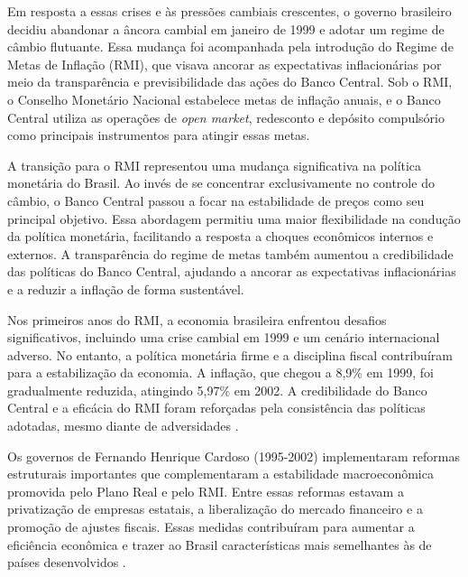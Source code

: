 \documentclass[12pt,oneside,a4paper,chapter=TITLE,english,brazil,sumario=abnt-6027-2012]{abntex2}
\begin{document}
Em resposta a essas crises e às pressões cambiais crescentes, o governo brasileiro decidiu abandonar a âncora cambial em janeiro de 1999 e adotar um regime de câmbio flutuante. Essa mudança foi acompanhada pela introdução do Regime de Metas de Inflação (RMI), que visava ancorar as expectativas inflacionárias por meio da transparência e previsibilidade das ações do Banco Central. Sob o RMI, o Conselho Monetário Nacional estabelece metas de inflação anuais, e o Banco Central utiliza as operações de \textit{open market}, redesconto e depósito compulsório como  principais instrumentos para atingir essas metas.


A transição para o RMI representou uma mudança significativa na política monetária do Brasil. Ao invés de se concentrar exclusivamente no controle do câmbio, o Banco Central passou a focar na estabilidade de preços como seu principal objetivo. Essa abordagem permitiu uma maior flexibilidade na condução da política monetária, facilitando a resposta a choques econômicos internos e externos. A transparência do regime de metas também aumentou a credibilidade das políticas do Banco Central, ajudando a ancorar as expectativas inflacionárias e a reduzir a inflação de forma sustentável.

Nos primeiros anos do RMI, a economia brasileira enfrentou desafios significativos, incluindo uma crise cambial em 1999 e um cenário internacional adverso. No entanto, a política monetária firme e a disciplina fiscal contribuíram para a estabilização da economia. A inflação, que chegou a 8,9\% em 1999, foi gradualmente reduzida, atingindo 5,97\% em 2002. A credibilidade do Banco Central e a eficácia do RMI foram reforçadas pela consistência das políticas adotadas, mesmo diante de adversidades \cite{fabiogiambiagi_1999_a}.

Os governos de Fernando Henrique Cardoso (1995-2002) implementaram reformas estruturais importantes que complementaram a estabilidade macroeconômica promovida pelo Plano Real e pelo RMI. Entre essas reformas estavam a privatização de empresas estatais, a liberalização do mercado financeiro e a promoção de ajustes fiscais. Essas medidas contribuíram para aumentar a eficiência econômica e trazer ao Brasil características mais semelhantes às de países desenvolvidos \cite{fabiogiambiagi_2016_economia}.
\end{document}
